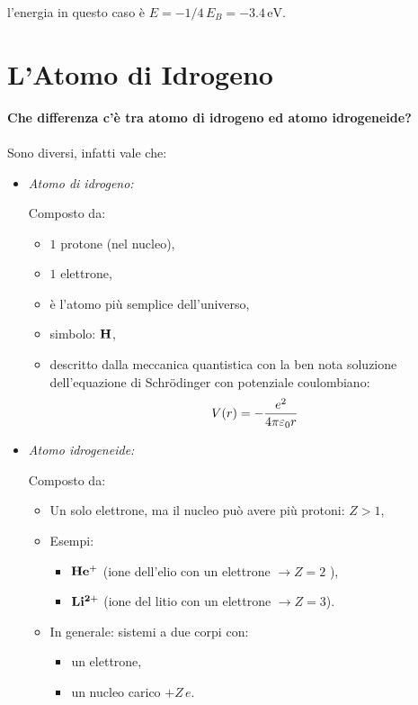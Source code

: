 	l'energia in questo caso è $E = - 1/4 \, E_B = - 3.4 \, \text{eV}$.

\section{L'Atomo di Idrogeno}

\begin{myapprf}
	\textbf{Che differenza c'è tra atomo di idrogeno ed atomo idrogeneide?}
	\\
	\\
	Sono diversi, infatti vale che:
	
\begin{itemize}
	\item \textit{Atomo di idrogeno:}
	
		Composto da:
		
	\begin{itemize}
		\item $1$ protone (nel nucleo),
			
		\item $1$ elettrone,
		
		\item è l’atomo più semplice dell’universo,
		
		\item simbolo: $\vb{H}$,
		
		\item descritto dalla meccanica quantistica con la ben nota soluzione dell’equazione di Schrödinger con potenziale coulombiano:
		\begin{align*}
			V\qty(r) = - \frac{e^2}{4\pi \varepsilon_0 r}
		\end{align*}

	\end{itemize}

	
	\item \textit{Atomo idrogeneide:}
	
		Composto da:
		
	\begin{itemize}
		\item Un solo elettrone, ma il nucleo può avere più protoni: $Z > 1$,
		\item Esempi:
		\begin{itemize}
			\item $\vb{He^+}$ (ione dell'elio con un elettrone $\to Z = 2$ ),
			\item $\vb{Li^{2+}}$ (ione del litio con un elettrone $\to Z = 3$).
		\end{itemize}

		\item In generale: sistemi a due corpi con:
		\begin{itemize}
			\item un elettrone, 
			\item un nucleo carico $+Z \, e$.
		\end{itemize}

	\end{itemize}
\end{itemize}

\end{myapprf}

